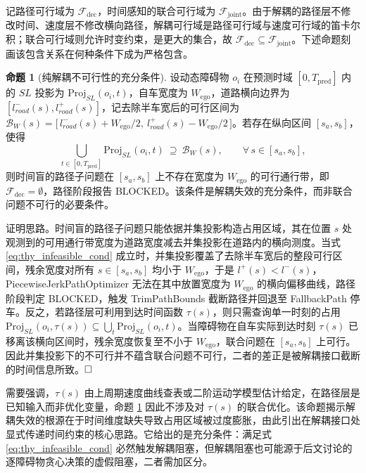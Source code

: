 \documentclass[a4paper,11pt]{ctexart}
\theoremstyle{definition}
\newtheorem{proposition}{命题}[section]
\begin{document}
记路径可行域为 $\mathcal{F}_{\text{dec}}$，时间感知的联合可行域为 $\mathcal{F}_{\text{joint}}$。由于解耦的路径层不修改时间、速度层不修改横向路径，解耦可行域是路径可行域与速度可行域的笛卡尔积；联合可行域则允许时变约束，是更大的集合，故 $\mathcal{F}_{\text{dec}} \subseteq \mathcal{F}_{\text{joint}}$。下述命题刻画该包含关系在何种条件下成为严格包含。

\begin{proposition}[纯解耦不可行性的充分条件]
\label{prop:decoupled_infeasible}
设动态障碍物 $o_i$ 在预测时域 $[0, T_{\text{pred}}]$ 内的 $SL$ 投影为 $\mathrm{Proj}_{SL}(o_i, t)$，自车宽度为 $W_{\text{ego}}$，道路横向边界为 $[l_{road}^{-}(s), l_{road}^{+}(s)]$，记去除半车宽后的可行区间为 $\mathcal{B}_{W}(s) = \bigl[\, l_{road}^{-}(s) + W_{\text{ego}}/2,\ l_{road}^{+}(s) - W_{\text{ego}}/2 \,\bigr]$。若存在纵向区间 $[s_a, s_b]$，使得
\begin{equation}
    \bigcup_{t \in [0, T_{\text{pred}}]} \mathrm{Proj}_{SL}(o_i, t)\ \supseteq\ \mathcal{B}_{W}(s), \qquad \forall\, s \in [s_a, s_b],
    \label{eq:thy_infeasible_cond}
\end{equation}
则时间盲的路径子问题在 $[s_a, s_b]$ 上不存在宽度为 $W_{\text{ego}}$ 的可行通行带，即 $\mathcal{F}_{\text{dec}} = \emptyset$，路径阶段报告 BLOCKED。该条件是解耦失效的充分条件，而非联合问题不可行的必要条件。
\end{proposition}

证明思路。时间盲的路径子问题只能依据并集投影构造占用区域，其在位置 $s$ 处观测到的可用通行带宽度为道路宽度减去并集投影在道路内的横向测度。当式 \eqref{eq:thy_infeasible_cond} 成立时，并集投影覆盖了去除半车宽后的整段可行区间，残余宽度对所有 $s \in [s_a, s_b]$ 均小于 $W_{\text{ego}}$，于是 $l^{+}(s) < l^{-}(s)$，PiecewiseJerkPathOptimizer 无法在其中放置宽度为 $W_{\text{ego}}$ 的横向偏移曲线，路径阶段判定 BLOCKED，触发 TrimPathBounds 截断路径并回退至 FallbackPath 停车。反之，若路径层可利用到达时间函数 $\tau(s)$，则只需查询单一时刻的占用 $\mathrm{Proj}_{SL}(o_i, \tau(s)) \subseteq \bigcup_t \mathrm{Proj}_{SL}(o_i, t)$。当障碍物在自车实际到达时刻 $\tau(s)$ 已移离该横向区间时，残余宽度恢复至不小于 $W_{\text{ego}}$，联合问题在 $[s_a, s_b]$ 上可行。因此并集投影下的不可行并不蕴含联合问题不可行，二者的差正是被解耦接口截断的时间信息所致。$\hfill\Box$

需要强调，$\tau(s)$ 由上周期速度曲线查表或二阶运动学模型估计给定，在路径层是已知输入而非优化变量，命题 \ref{prop:decoupled_infeasible} 因此不涉及对 $\tau(s)$ 的联合优化。该命题揭示解耦失效的根源在于时间维度缺失导致占用区域被过度膨胀，由此引出在解耦接口处显式传递时间约束的核心思路。它给出的是充分条件：满足式 \eqref{eq:thy_infeasible_cond} 必然触发解耦阻塞，但解耦阻塞也可能源于后文讨论的逐障碍物贪心决策的虚假阻塞，二者需加区分。
\end{document}
